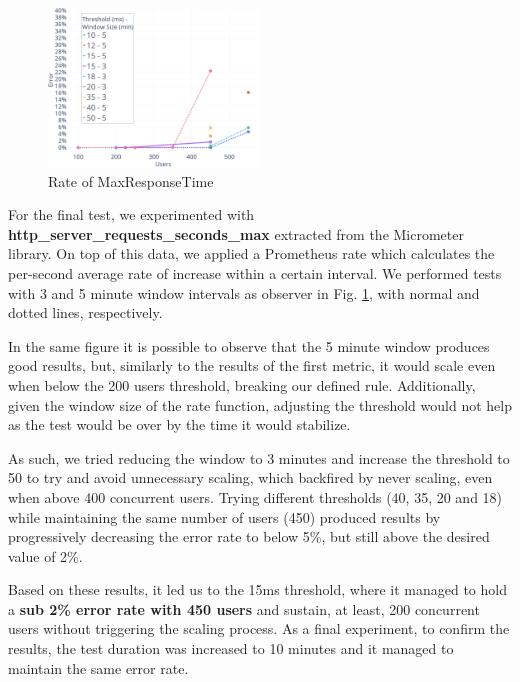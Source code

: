 \begin{figure}[h]
    \centering
    \includegraphics[width=0.5\textwidth]{Chapters/img/testing/HPA_HttpMaxRateLeft.png}
    \caption{Rate of MaxResponseTime}
    \label{fig:metric_max}
\end{figure}

For the final test, we experimented with \textbf{http\_server\_requests\_seconds\_max} extracted from the Micrometer library. On top of this data, we applied a Prometheus rate which calculates the per-second average rate of increase within a certain interval. We performed tests with 3 and 5 minute window intervals as observer in Fig. \ref{fig:metric_max}, with normal and dotted lines, respectively. 

In the same figure it is possible to observe that the 5 minute window produces good results, but, similarly to the results of the first metric, it would scale even when below the 200 users threshold, breaking our defined rule. Additionally, given the window size of the rate function, adjusting the threshold would not help as the test would be over by the time it would stabilize.

As such, we tried reducing the window to 3 minutes and increase the threshold to 50 to try and avoid unnecessary scaling, which backfired by never scaling, even when above 400 concurrent users. Trying different thresholds (40, 35, 20 and 18) while maintaining the same number of users (450) produced results by progressively decreasing the error rate to below 5\%, but still above the desired value of 2\%.

Based on these results, it led us to the 15ms threshold, where it managed to hold a \textbf{sub 2\% error rate with 450 users} and sustain, at least, 200 concurrent users without triggering the scaling process. As a final experiment, to confirm the results, the test duration was increased to 10 minutes and it managed to maintain the same error rate.






